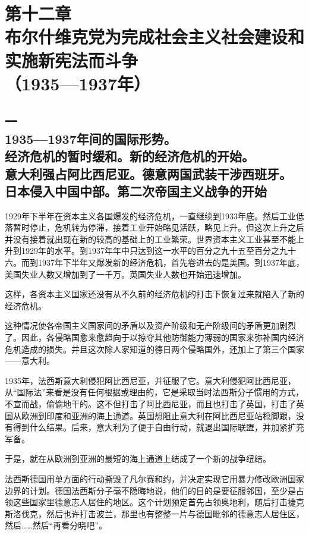 \section[第十二章\q 布尔什维克党为完成社会主义社会建设和实施新宪法而斗争（1935—1937年）]{第十二章\\ 布尔什维克党为完成社会主义社会建设和\\实施新宪法而斗争 \\{（1935—1937年）}}

\subsection[一\q 1935—1937年间的国际形势。经济危机的暂时缓和。新的经济危机的开始。意大利强占阿比西尼亚。德意两国武装干涉西班牙。日本侵入中国中部。第二次帝国主义战争的开始]{一\\ 1935—1937年间的国际形势。\\经济危机的暂时缓和。新的经济危机的开始。\\意大利强占阿比西尼亚。德意两国武装干涉西班牙。\\日本侵入中国中部。第二次帝国主义战争的开始}

1929年下半年在资本主义各国爆发的经济危机，一直继续到1933年底。然后工业低落暂时停止，危机转为停滞，接着工业开始略见活跃，略见上升。但这次上升之后并没有接着就出现在新的较高的基础上的工业繁荣。世界资本主义工业甚至不能上升到1929年的水平。到1937年年中只达到这一水平的百分之九十五至百分之九十六。而到1937年下半年又爆发新的经济危机，首先卷进去的是美国。到1937年底，美国失业人数又增加到了一千万。英国失业人数也开始迅速增加。

这样，各资本主义国家还没有从不久前的经济危机的打击下恢复过来就陷入了新的经济危机。

这种情况使各帝国主义国家间的矛盾以及资产阶级和无产阶级间的矛盾更加剧烈了。因此，各侵略国愈来愈趋向于以掠夺其他防御能力薄弱的国家来弥补国内经济危机造成的损失。并且这次除人家知道的德日两个侵略国外，还加上了第三个国家——意大利。

1935年，法西斯意大利侵犯阿比西尼亚，并征服了它。意大利侵犯阿比西尼亚，从“国际法”来看是没有任何根据或理由的，它是采取当时法西斯分子惯用的方式，不宣而战，偷偷地干的。这不但打击了阿比西尼亚，而且也打击了英国，打击了英国从欧洲到印度和亚洲的海上通道。英国想阻止意大利在阿比西尼亚站稳脚跟，没有得到什么结果。后来，意大利为了便于自由行动，就退出国际联盟，并加紧扩充军备。

于是，就在从欧洲到亚洲的最短的海上通道上结成了一个新的战争纽结。

法西斯德国用单方面的行动撕毁了凡尔赛和约，并决定实现它用暴力修改欧洲国家边界的计划。德国法西斯分子毫不隐晦地说，他们的目的是要征服邻国，至少是占领这些国家里德意志人居住的地区。这个计划预定首先占领奥地利，随后打击捷克斯洛伐克，然后也许打击波兰，那里也有整整一片与德国毗邻的德意志人居住区，然后……然后“再看分晓吧”。

